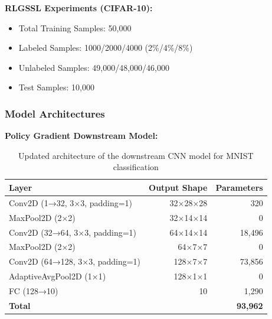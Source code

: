 \documentclass{scrartcl}
\begin{document}
\textbf{RLGSSL Experiments (CIFAR-10):}
\begin{itemize}
    \item Total Training Samples: 50,000
    \item Labeled Samples: 1000/2000/4000 (2\%/4\%/8\%)
    \item Unlabeled Samples: 49,000/48,000/46,000
    \item Test Samples: 10,000
\end{itemize}

\subsubsection{Model Architectures}

\textbf{Policy Gradient Downstream Model:}
\begin{table}[H]
    \centering
    \begin{tabular}{lrr}
        \hline
        \textbf{Layer} & \textbf{Output Shape} & \textbf{Parameters} \\
        \hline
        Conv2D (1→32, 3×3, padding=1) & 32×28×28 & 320 \\
        MaxPool2D (2×2) & 32×14×14 & 0 \\
        Conv2D (32→64, 3×3, padding=1) & 64×14×14 & 18,496 \\
        MaxPool2D (2×2) & 64×7×7 & 0 \\
        Conv2D (64→128, 3×3, padding=1) & 128×7×7 & 73,856 \\
        AdaptiveAvgPool2D (1×1) & 128×1×1 & 0 \\
        FC (128→10) & 10 & 1,290 \\
        \hline
        \textbf{Total} & & \textbf{93,962} \\
        \hline
    \end{tabular}
    \caption{Updated architecture of the downstream CNN model for MNIST classification}
    \label{tab:downstream_architecture}
\end{table}
\end{document}
